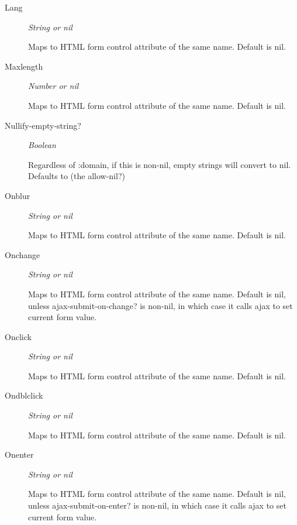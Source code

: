 \documentclass [11pt]{book}
\begin{document}
\begin{itemize}
\begin{description}
\item [Lang]
\emph{String or nil}

 Maps to HTML form control attribute of the same name. Default is nil.




\item [Maxlength]
\emph{Number or nil}

 Maps to HTML form control attribute of the same name. Default is nil.




\item [Nullify-empty-string?]
\emph{Boolean}

 Regardless of :domain, if this is non-nil, empty strings will convert to nil. Defaults to (the allow-nil?)




\item [Onblur]
\emph{String or nil}

 Maps to HTML form control attribute of the same name. Default is nil.




\item [Onchange]
\emph{String or nil}

 Maps to HTML form control attribute of the same name. Default is nil, unless ajax-submit-on-change? is non-nil, in which case it calls ajax to set current form value.




\item [Onclick]
\emph{String or nil}

 Maps to HTML form control attribute of the same name. Default is nil.




\item [Ondblclick]
\emph{String or nil}

 Maps to HTML form control attribute of the same name. Default is nil.




\item [Onenter]
\emph{String or nil}

 Maps to HTML form control attribute of the same name. Default is nil, unless ajax-submit-on-enter? is non-nil, in which case it calls ajax to set current form value.





\end{description}
\end{itemize}
\end{document}

